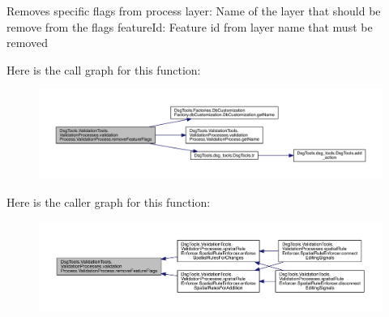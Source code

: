\begin{DoxyVerb}Removes specific flags from process
layer: Name of the layer that should be remove from the flags
featureId: Feature id from layer name that must be removed
\end{DoxyVerb}
 Here is the call graph for this function\+:
\nopagebreak
\begin{figure}[H]
\begin{center}
\leavevmode
\includegraphics[width=350pt]{class_dsg_tools_1_1_validation_tools_1_1_validation_processes_1_1validation_process_1_1_validation_process_ae186e13b7a324f4f301f1c7d9cb7c8de_cgraph}
\end{center}
\end{figure}
Here is the caller graph for this function\+:
\nopagebreak
\begin{figure}[H]
\begin{center}
\leavevmode
\includegraphics[width=350pt]{class_dsg_tools_1_1_validation_tools_1_1_validation_processes_1_1validation_process_1_1_validation_process_ae186e13b7a324f4f301f1c7d9cb7c8de_icgraph}
\end{center}
\end{figure}
\mbox{\label{class_dsg_tools_1_1_validation_tools_1_1_validation_processes_1_1validation_process_1_1_validation_process_af50a5bfb0819a8d2c7691550582c1c6a}} 

